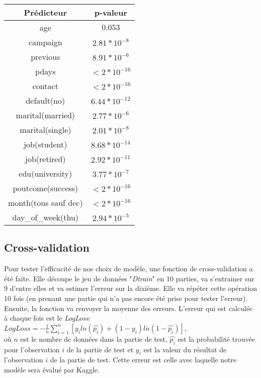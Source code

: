 \documentclass[11pt]{article}
\begin{document}
	\begin{center}
  	 	\begin{tabular}{| c | c |}
  	 	\hline
  	 	Prédicteur & p-valeur \\
  	 	\hline
  	 	age & $0.053$ \\
  	 	\hline
  	 	campaign & $2.81*10^{-8}$ \\
  	 	\hline
  	 	previous & $8.91*10^{-6}$ \\
		\hline  	 	
  	 	pdays & $<2*10^{-16}$ \\
		\hline
		contact & $<2*10^{-16}$ \\
  	 	\hline
  	 	default(no) & $6.44*10^{-12}$ \\
  	 	\hline
  	 	marital(married) & $2.77*10^{-6}$ \\
  	 	\hline
  	 	marital(single) & $2.01*10^{-8}$ \\
  	 	\hline
  	 	job(student) & $8.68*10^{-14}$ \\
  	 	\hline
  	 	job(retired) & $2.92*10^{-11}$ \\
  	 	\hline
  	 	edu(university) & $3.77*10^{-7}$ \\
  	 	\hline
  	 	poutcome(success) & $<2*10^{-16}$ \\
  	 	\hline
  	 	month(tous sauf dec) & $<2*10^{-16}$ \\
  	 	\hline
  	 	day\_of\_week(thu) & $2.94*10^{-5}$ \\
  	 	\hline
  	 	\end{tabular}
  	\end{center}
	\subsection{Cross-validation}
	Pour tester l'efficacité de nos choix de modèle, une fonction de cross-validation a été faite. Elle découpe le jeu de données "\emph{Dtrain}" en 10 parties, va s'entrainer sur 9 d'entre elles et va estimer l'erreur sur la dixième. Elle va répéter cette opération 10 fois (en prenant une partie qui n'a pas encore été prise pour tester l'erreur). Ensuite, la fonction va renvoyer la moyenne des erreurs. L'erreur qui est calculée à chaque fois est le \emph{LogLoss}: 
	\\$LogLoss=-\frac{1}{n}\sum_{i=1}^{n}[y_iln(\widehat{p_i})+(1-y_i)ln(1-\widehat{p_i})]$, 
	\\où $n$ est le nombre de données dans la partie de test, $\widehat{p_i}$ est la probabilité trouvée pour l'observation $i$ de la partie de test et $y_i$ est la valeur du résultat de l'observation $i$ de la partie de test. Cette erreur est celle avec laquelle notre modèle sera évalué par Kaggle. 
\end{document}
